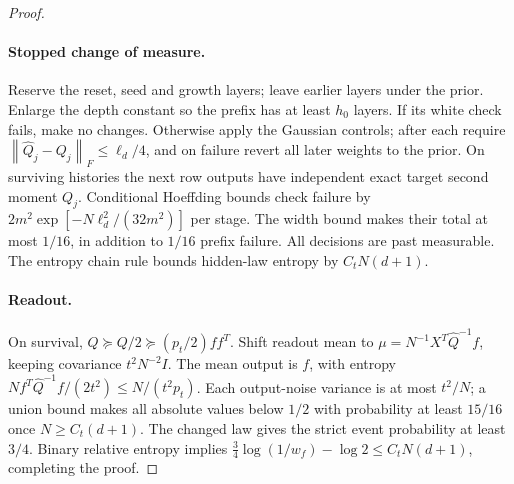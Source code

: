 \documentclass[11pt]{article}
\newcommand{\norm}[1]{\left\lVert#1\right\rVert}
\begin{document}
\begin{proof}
\paragraph{Stopped change of measure.}
Reserve the reset, seed and growth layers; leave earlier layers under the prior. Enlarge the depth constant so the prefix has at least $h_0$ layers. If its white check fails, make no changes. Otherwise apply the Gaussian controls; after each require $\norm{\widehat Q_j-Q_j}_F\le\ell_d/4$, and on failure revert all later weights to the prior. On surviving histories the next row outputs have independent exact target second moment $Q_j$. Conditional Hoeffding bounds check failure by $2m^2\exp[-N\ell_d^2/(32m^2)]$ per stage. The width bound makes their total at most $1/16$, in addition to $1/16$ prefix failure. All decisions are past measurable. The entropy chain rule bounds hidden-law entropy by $C_tN(d+1)$.

\paragraph{Readout.}
On survival, $\widehat Q\succeq Q/2\succeq(p_t/2)ff^T$. Shift readout mean to $\mu=N^{-1}X^T\widehat Q^{-1}f$, keeping covariance $t^2N^{-2}I$. The mean output is $f$, with entropy $Nf^T\widehat Q^{-1}f/(2t^2)\le N/(t^2p_t)$. Each output-noise variance is at most $t^2/N$; a union bound makes all absolute values below $1/2$ with probability at least $15/16$ once $N\ge C_t(d+1)$. The changed law gives the strict event probability at least $3/4$. Binary relative entropy implies $\tfrac34\log(1/w_f)-\log2\le C_tN(d+1)$, completing the proof.
\end{proof}
\end{document}
